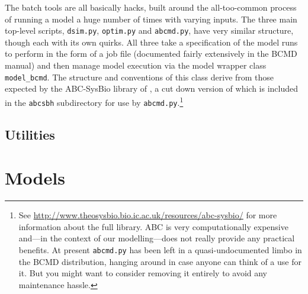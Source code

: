 \documentclass[a4paper,11pt]{article}
\begin{document}
The batch tools are all basically hacks, built around the all-too-common process of running a model a huge number of times with varying inputs. The three main top-level scripts, \texttt{dsim.py}, \texttt{optim.py} and \texttt{abcmd.py}, have very similar structure, though each with its own quirks. All three take a specification of the model runs to perform in the form of a job file (documented fairly extensively in the BCMD manual) and then manage model execution via the model wrapper class \texttt{model\_bcmd}. The structure and conventions of this class derive from those expected by the ABC-SysBio library of \citet{Liepe:2010eg}, a cut down version of which is included in the \texttt{abcsbh} subdirectory for use by \texttt{abcmd.py}.\footnote{See \url{http://www.theosysbio.bio.ic.ac.uk/resources/abc-sysbio/} for more information about the full library. ABC is very computationally expensive and---in the context of our modelling---does not really provide any practical benefits. At present \texttt{abcmd.py} has been left in a quasi-undocumented limbo in the BCMD distribution, hanging around in case anyone can think of a use for it. But you might want to consider removing it entirely to avoid any maintenance hassle.}


\subsection{Utilities}

\section{Models}




\end{document}
